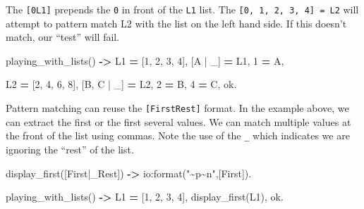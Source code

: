 \documentclass[
]{book}
\newenvironment{Shaded}{\begin{snugshade}}{\end{snugshade}}
\newcommand{\CharTok}[1]{\textcolor[rgb]{0.31,0.60,0.02}{#1}}
\newcommand{\DecValTok}[1]{\textcolor[rgb]{0.00,0.00,0.81}{#1}}
\newcommand{\FunctionTok}[1]{\textcolor[rgb]{0.00,0.00,0.00}{#1}}
\newcommand{\OperatorTok}[1]{\textcolor[rgb]{0.81,0.36,0.00}{\textbf{#1}}}
\newcommand{\StringTok}[1]{\textcolor[rgb]{0.31,0.60,0.02}{#1}}
\newcommand{\VariableTok}[1]{\textcolor[rgb]{0.00,0.00,0.00}{#1}}
\begin{document}
The \texttt{{[}0\textbar{}L1{]}} prepends the \texttt{0} in front of the \texttt{L1} list. The \texttt{{[}0,\ 1,\ 2,\ 3,\ 4{]}\ =\ L2} will attempt to pattern match L2 with the list on the left hand side. If this doesn't match, our ``test'' will fail.

\begin{Shaded}
\begin{Highlighting}[]
\FunctionTok{playing\_with\_lists()} \OperatorTok{{-}\textgreater{}}
   \VariableTok{L1} \OperatorTok{=} \FunctionTok{[}\DecValTok{1}\FunctionTok{,} \DecValTok{2}\FunctionTok{,} \DecValTok{3}\FunctionTok{,} \DecValTok{4}\FunctionTok{],}
   \FunctionTok{[}\VariableTok{A} \FunctionTok{|} \VariableTok{\_}\FunctionTok{]} \OperatorTok{=} \VariableTok{L1}\FunctionTok{,}
   \DecValTok{1} \OperatorTok{=} \VariableTok{A}\FunctionTok{,}

   \VariableTok{L2} \OperatorTok{=} \FunctionTok{[}\DecValTok{2}\FunctionTok{,} \DecValTok{4}\FunctionTok{,} \DecValTok{6}\FunctionTok{,} \DecValTok{8}\FunctionTok{],}
   \FunctionTok{[}\VariableTok{B}\FunctionTok{,} \VariableTok{C} \FunctionTok{|} \VariableTok{\_}\FunctionTok{]} \OperatorTok{=} \VariableTok{L2}\FunctionTok{,}
   \DecValTok{2} \OperatorTok{=} \VariableTok{B}\FunctionTok{,}
   \DecValTok{4} \OperatorTok{=} \VariableTok{C}\FunctionTok{,}
   \CharTok{ok}\FunctionTok{.}
\end{Highlighting}
\end{Shaded}

Pattern matching can reuse the \texttt{{[}First\textbar{}Rest{]}} format. In the example above, we can extract the first or the first several values. We can match multiple values at the front of the list using commas. Note the use of the \texttt{\_} which indicates we are ignoring the ``rest'' of the list.

\begin{Shaded}
\begin{Highlighting}[]
\FunctionTok{display\_first([}\VariableTok{First}\FunctionTok{|}\VariableTok{\_Rest}\FunctionTok{])} \OperatorTok{{-}\textgreater{}}
    \FunctionTok{io:format(}\StringTok{"\textasciitilde{}p\textasciitilde{}n"}\FunctionTok{,[}\VariableTok{First}\FunctionTok{]).}

\FunctionTok{playing\_with\_lists()} \OperatorTok{{-}\textgreater{}}
    \VariableTok{L1} \OperatorTok{=} \FunctionTok{[}\DecValTok{1}\FunctionTok{,} \DecValTok{2}\FunctionTok{,} \DecValTok{3}\FunctionTok{,} \DecValTok{4}\FunctionTok{],}
    \FunctionTok{display\_first(}\VariableTok{L1}\FunctionTok{),}   
    \CharTok{ok}\FunctionTok{.}
\end{Highlighting}
\end{Shaded}
\end{document}
